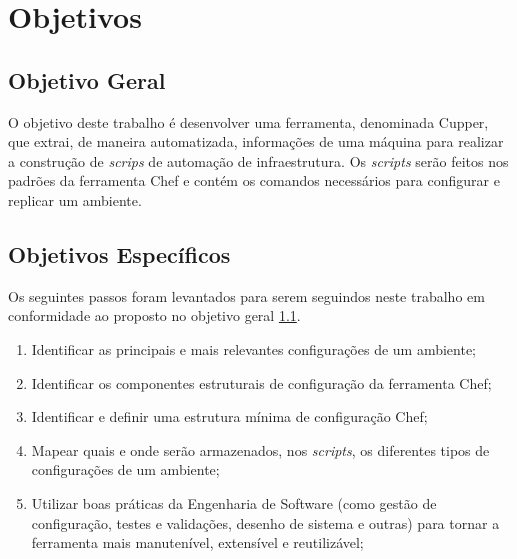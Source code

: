 \section{Objetivos}
\label{sec:obj}

\subsection{Objetivo Geral}
\label{sec:obj-grl}

O objetivo deste trabalho é desenvolver uma ferramenta, denominada Cupper,
que extrai, de maneira automatizada, informações de uma máquina para realizar
a construção de \textit{scrips} de automação de infraestrutura. Os \textit{scripts}
serão feitos nos padrões da ferramenta Chef e contém os comandos
necessários para configurar e replicar um ambiente.

\subsection{Objetivos Específicos}
\label{sec:obj-esp}

Os seguintes passos foram levantados para serem seguindos neste trabalho
em conformidade ao proposto no objetivo geral \ref{sec:obj-grl}.

\begin{enumerate}
  \item Identificar as principais e mais relevantes configurações de um ambiente;
  \item Identificar os componentes estruturais de configuração da ferramenta Chef;
  \item Identificar e definir uma estrutura mínima de configuração Chef;
  \item Mapear quais e onde serão armazenados, nos \textit{scripts}, os
    diferentes tipos de configurações de um ambiente;
  \item Utilizar boas práticas da Engenharia de Software (como gestão de configuração,
    testes e validações, desenho de sistema e outras) para tornar a ferramenta mais
    manutenível, extensível e reutilizável;
\end{enumerate}
